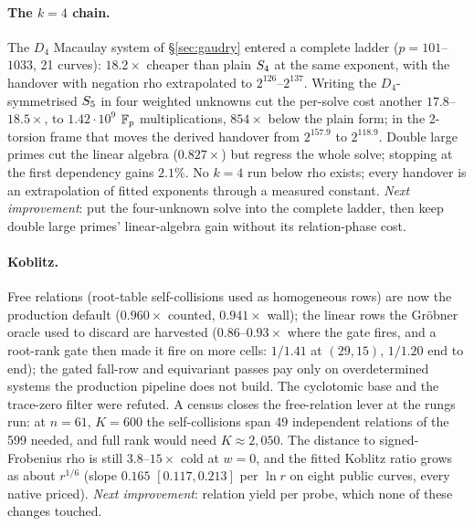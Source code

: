 \paragraph{The $k=4$ chain.} The $D_4$ Macaulay system of
\S\ref{sec:gaudry} entered a complete ladder ($p=101$--$1033$, 21 curves):
$18.2\times$ cheaper than plain $S_{4}$ at the same exponent, with the
handover with negation rho extrapolated to $2^{126}$--$2^{137}$. Writing
the $D_4$-symmetrised $S_{5}$ in four weighted unknowns cut the per-solve
cost another $17.8$--$18.5\times$, to $1.42\cdot10^9$ $\mathbb{F}_p$
multiplications, $854\times$ below the plain form; in the 2-torsion frame
that moves the derived handover from $2^{157.9}$ to $2^{118.9}$. Double
large primes cut the linear algebra ($0.827\times$) but regress the whole
solve; stopping at the first dependency gains $2.1\%$. No $k=4$ run below
rho exists; every handover is an extrapolation of fitted exponents through
a measured constant. \emph{Next improvement}: put the four-unknown solve
into the complete ladder, then keep double large primes' linear-algebra
gain without its relation-phase cost.

\paragraph{Koblitz.} Free relations (root-table self-collisions used as
homogeneous rows) are now the production default ($0.960\times$ counted,
$0.941\times$ wall); the linear rows the Gr\"obner oracle used to discard
are harvested ($0.86$--$0.93\times$ where the gate fires, and a root-rank
gate then made it fire on more cells: $1/1.41$ at $(29,15)$, $1/1.20$ end
to end); the gated
fall-row and equivariant passes pay only on overdetermined systems the
production pipeline does not build. The cyclotomic base and the trace-zero
filter were refuted. A census closes the free-relation lever at the rungs
run: at $n=61$, $K=600$ the self-collisions span 49 independent relations of
the 599 needed, and full rank would need $K\approx2{,}050$. The distance to
signed-Frobenius rho is still $3.8$--$15\times$ cold at $w=0$, and the
fitted Koblitz ratio grows as about $r^{1/6}$ (slope $0.165$ $[0.117,0.213]$
per $\ln r$ on eight public curves, every native priced).
\emph{Next improvement}: relation yield per probe, which none of these
changes touched.

